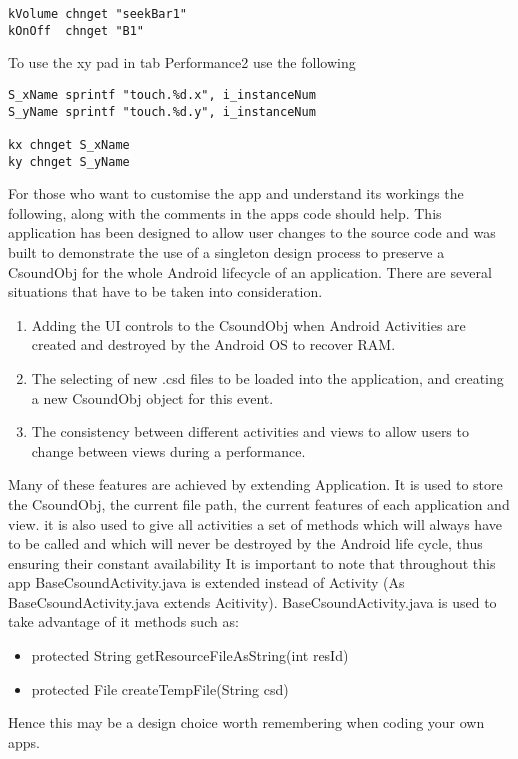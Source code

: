 \documentclass[11pt]{article}
\begin{document}
\begin{lstlisting}[caption=Exampe of code to be used in .csd to connect Seekbars and Buttons]
kVolume chnget "seekBar1"
kOnOff  chnget "B1"
\end{lstlisting}

To use the xy pad in tab Performance2 use the following
\begin{lstlisting}[caption=Exampe of code to be used in .csd to connect xy pad]
S_xName sprintf "touch.%d.x", i_instanceNum
S_yName sprintf "touch.%d.y", i_instanceNum

kx chnget S_xName
ky chnget S_yName
\end{lstlisting}

For those who want to customise the app and understand its workings the following, along with the comments in the apps code should help. This application has been designed to allow user changes to the source code and was built to demonstrate the use of a singleton design process to preserve a CsoundObj for the whole Android lifecycle of an application. There are several situations that have to be taken into consideration.

\begin{enumerate}
\item Adding the UI controls to the CsoundObj when Android Activities are created and destroyed by the Android OS to recover RAM.
\item The selecting of new .csd files to be loaded into the application, and creating a new CsoundObj object for this event. 
\item The consistency between different activities and views to allow users to change between views during a performance.
\end{enumerate}

Many of these features are achieved by extending Application. It is used to store the CsoundObj, the current file path, the current features of each application and view. it is also used to give all activities a set of methods which will always have to be called and which will never be destroyed by the Android life cycle, thus ensuring their constant availability
It is important to note that throughout this app BaseCsoundActivity.java is extended instead of Activity (As BaseCsoundActivity.java extends Acitivity). BaseCsoundActivity.java is used to take advantage of it methods such as:
\begin{itemize}
\item protected String getResourceFileAsString(int resId)
\item protected File createTempFile(String csd)
\end{itemize}
Hence this may be a design choice worth remembering when coding your own apps.
\end{document}
